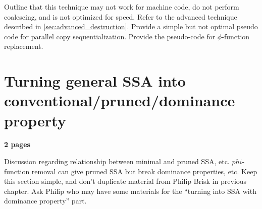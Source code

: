 Outline that this technique may not work for machine code, do not perform coalescing, and is not optimized for speed. Refer to the advanced technique described in \ref{sec:advanced_destruction}. Provide a simple but not optimal pseudo code for parallel copy sequentialization. Provide the pseudo-code for $\phi$-function replacement.

\section{Turning general SSA into conventional/pruned/dominance property}
\textbf{2 pages}

Discussion regarding relationship between minimal and pruned SSA, etc.
$phi$-function removal can give pruned SSA but break
dominance properties, etc. Keep this section simple, and don't duplicate
material from Philip Brisk in previous chapter.
Ask Philip who may have some materials for the ``turning into SSA with dominance property'' part.

